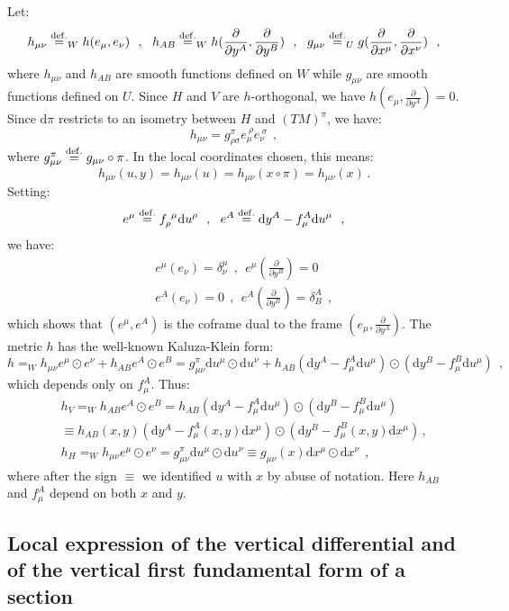 \documentclass[10pt, cmp, numbook, final, a4paper]{svjour}
\newcommand{\eqdef}{\stackrel{{\rm def.}}{=}}
\def\dd{\mathrm{d}}
\newcommand{\be}{\begin{equation*}}
\newcommand{\ee}{\end{equation*}}
\newcommand{\ben}{\begin{equation}}
\newcommand{\een}{\end{equation}}
\newcommand{\beqa}{\begin{eqnarray*}}
\newcommand{\eeqa}{\end{eqnarray*}}
\begin{document}
\noindent	
Let: 
\be
h_{\mu\nu}\eqdef_W h(e_\mu,e_\nu)~~,~~h_{AB}\eqdef_W h(\frac{\partial}{\partial y^A}, \frac{\partial}{\partial y^B})~~,~~ g_{\mu\nu}\eqdef_U g(\frac{\partial}{\partial x^\mu}, \frac{\partial}{\partial x^\nu})~~,
\ee
where $h_{\mu\nu}$ and $h_{AB}$ are smooth functions defined on $W$
while $g_{\mu\nu}$ are smooth functions defined on $U$. Since $H$ and
$V$ are $h$-orthogonal, we have $h(e_\mu, \frac{\partial}{\partial
y^A})=0$. Since $\dd\pi$ restricts to an isometry between $H$ and
$(TM)^\pi$, we have:
\be
h_{\mu\nu}=g_{\rho\sigma}^\pi e_\mu^{~\rho}e_\nu^{~\sigma}~~,
\ee
where $g_{\mu\nu}^\pi \eqdef g_{\mu\nu}\circ \pi$. In the local
coordinates chosen, this means:
\be
h_{\mu\nu}(u,y)=h_{\mu\nu}(u) = h_{\mu\nu}(x\circ\pi) = h_{\mu\nu}(x)\, .
\ee
Setting:
\be
e^\mu\eqdef f_\rho^{~\mu}\dd u^\rho~~,~~e^A\eqdef \dd y^A-f_\mu^A \dd u^\mu~~,
\ee
we have:
\beqa
&& e^\mu(e_\nu)=\delta^\mu_\nu~~,~~e^\mu(\frac{\partial}{\partial y^B})=0 \\
&& e^A(e_\nu)=0~~,~~e^A(\frac{\partial}{\partial  y^B})=\delta^A_B~~,
\eeqa
which shows that $(e^\mu,e^A)$ is the coframe dual to the frame
$(e_\mu, \frac{\partial}{\partial y^A})$. The metric $h$ has the
well-known Kaluza-Klein form:
\ben
\label{hlocal}
h=_W h_{\mu\nu} e^\mu\odot e^\nu+h_{AB} e^A\odot e^B=g_{\mu\nu}^\pi 
\dd u^\mu \odot \dd u^\nu +h_{AB}(\dd y^A-f_\mu^A\dd u^\mu)\odot (\dd y^B-f_\mu^B\dd u^\mu) ~~,
\een
which depends only on $f_\mu^A$. Thus: 
\beqa
&& h_V=_W h_{AB} e^A\odot e^B=h_{AB}(\dd y^A-f_\mu^A\dd u^\mu)\odot (\dd y^B-f_\mu^B\dd u^\mu) \\ && \equiv h_{AB}(x,y)(\dd y^A-f_\mu^A(x,y)\dd x^\mu)\odot (\dd y^B-f_\mu^B(x,y)\dd x^\mu)\, ,\\
&& h_H=_W h_{\mu\nu} e^\mu\odot e^\nu=g_{\mu\nu}^\pi \dd u^\mu\odot \dd u^\nu\equiv g_{\mu\nu}(x) \dd x^\mu\odot \dd x^\nu~~,
\eeqa
where after the sign $\equiv$ we identified $u$ with $x$ by abuse of
notation. Here $h_{AB}$ and $f_\mu^A$ depend on both $x$ and $y$.

\subsection{Local expression of the vertical differential and of the vertical first fundamental form of a section}
\end{document}
